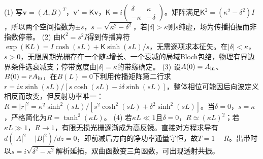 (1) 写\(\boldsymbol v=(A,B)^T\)，\(\boldsymbol v'=\mathsf K\boldsymbol v\)，\(\mathsf K=i\begin{pmatrix}\delta&\kappa\\-\kappa&-\delta\end{pmatrix}\)。矩阵满足\(\mathsf K^2=(\kappa^2-\delta^2)I\)，所以两个空间指数为\(\pm s\)，\(s=\sqrt{\kappa^2-\delta^2}\)，若\(|\delta|>\kappa\)则\(s\)纯虚，场为传播拍振而非指数停带。
(2) 由\(\mathsf K^2=s^2I\)得到传播算符\(\exp(\mathsf KL)=I\cosh(sL)+\mathsf K\sinh(sL)/s\)，无需逐项求本征矢。在\(|\delta|<\kappa\)，\(s>0\)，无限周期光栅存在一个随\(z\)增长、一个衰减的局域Bloch包络，物理有界边界条件选衰减支；停带宽度由\(|\delta|=\kappa\)的带缘确定。
(3) 设\(A(0)=A_{\rm in}\)、\(B(0)=rA_{\rm in}\)，在\(B(L)=0\)下利用传播矩阵第二行求\(r=i\kappa\sinh(sL)/[s\cosh(sL)-i\delta\sinh(sL)]\)，整体相位可能因后向波定义相反而改变，但反射功率唯一：\(R=|r|^2=\kappa^2\sinh^2(sL)/[s^2\cosh^2(sL)+\delta^2\sinh^2(sL)]\)。当\(\delta=0\)，\(s=\kappa\)，严格简化为\(R=\tanh^2(\kappa L)\)。
(4) 若\(\kappa L\ll1\)且\(\delta=0\)，\(R\simeq(\kappa L)^2\)；若\(\kappa L\gg1\)，\(R\to1\)，有限无损光栅逐渐成为高反镜。直接对方程求导有\(d(|A|^2-|B|^2)/dz=0\)，即前减后方向的净功率通量守恒，故\(T=1-R\)。出带时以\(s=i\sqrt{\delta^2-\kappa^2}\)解析延拓，双曲函数变三角函数，可出现透射共振。
